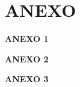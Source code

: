 \documentclass[12pt,a4paper,oneside]{report}
\begin{document}






\newpage


\appendix

\renewcommand{\appendixname}{ANEXO}%
\chapter*{\appendixname}

 \thispagestyle{empty}
 



\textbf{ANEXO 1} 

 \textbf{ANEXO 2} 
 
 \textbf{ANEXO 3} 
 


\end{document}

